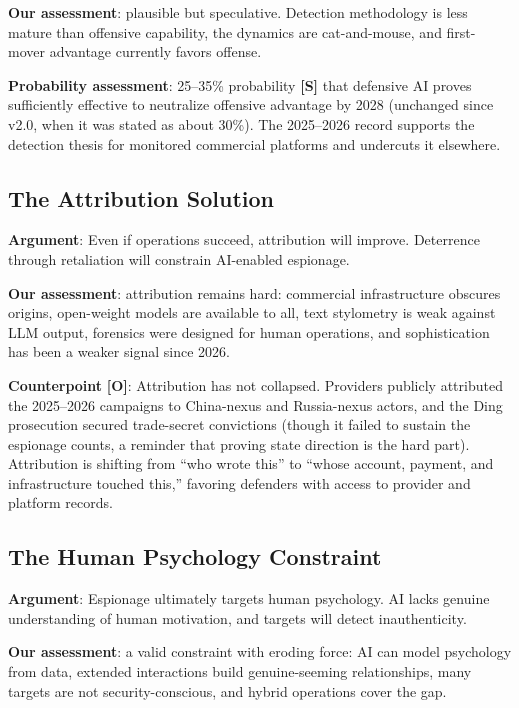 \documentclass[11pt,letterpaper]{article}
\begin{document}
\textbf{Our assessment}: plausible but speculative. Detection methodology is less mature than offensive capability, the dynamics are cat-and-mouse, and first-mover advantage currently favors offense.

\textbf{Probability assessment}: 25--35\% probability \textbf{[S]} that defensive AI proves sufficiently effective to neutralize offensive advantage by 2028 (unchanged since v2.0, when it was stated as about 30\%). The 2025--2026 record supports the detection thesis for monitored commercial platforms and undercuts it elsewhere.

\subsection{The Attribution Solution}

\textbf{Argument}: Even if operations succeed, attribution will improve. Deterrence through retaliation will constrain AI-enabled espionage.

\textbf{Our assessment}: attribution remains hard: commercial infrastructure obscures origins, open-weight models are available to all, text stylometry is weak against LLM output, forensics were designed for human operations, and sophistication has been a weaker signal since 2026.

\textbf{Counterpoint} \textbf{[O]}: Attribution has not collapsed. Providers publicly attributed the 2025--2026 campaigns to China-nexus and Russia-nexus actors, and the Ding prosecution secured trade-secret convictions (though it failed to sustain the espionage counts, a reminder that proving state direction is the hard part). Attribution is shifting from ``who wrote this'' to ``whose account, payment, and infrastructure touched this,'' favoring defenders with access to provider and platform records.

\subsection{The Human Psychology Constraint}

\textbf{Argument}: Espionage ultimately targets human psychology. AI lacks genuine understanding of human motivation, and targets will detect inauthenticity.

\textbf{Our assessment}: a valid constraint with eroding force: AI can model psychology from data, extended interactions build genuine-seeming relationships, many targets are not security-conscious, and hybrid operations cover the gap.
\end{document}
